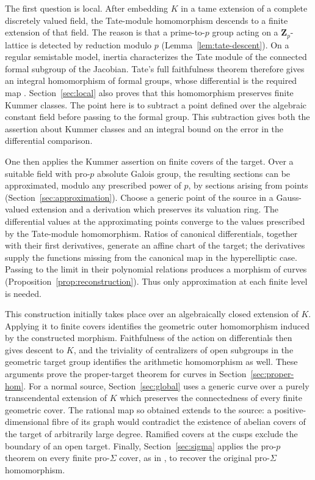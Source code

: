 \documentclass[11pt,a4paper]{article}
\numberwithin{equation}{section}
\theoremstyle{plain}
\theoremstyle{definition}
\theoremstyle{remark}
\newcommand{\Zp}{\mathbf Z_p}
\renewcommand{\S}{\ensuremath{\mathsection}}
\begin{document}
The first question is local. After embedding $K$ in a tame extension of a
complete discretely valued field, the Tate-module homomorphism descends to
a finite extension of that field. The reason is that a prime-to-$p$ group
acting on a $\Zp$-lattice is detected by reduction modulo $p$
(Lemma~\ref{lem:tate-descent}). On a regular semistable model, inertia
characterizes the Tate module of the connected formal subgroup of the
Jacobian. Tate's full faithfulness theorem therefore gives an integral
homomorphism of formal groups, whose differential is the required map
\cite[\S4.2, Theorem~4 and Corollary~1]{Tate1967}.
Section~\ref{sec:local} also proves that this homomorphism preserves finite
Kummer classes. The point here is to subtract a point defined over the
algebraic constant field before passing to the formal group. This
subtraction gives both the assertion about Kummer classes and an integral
bound on the error in the differential comparison.

One then applies the Kummer assertion on finite covers of the target.
Over a suitable field with pro-$p$ absolute Galois group, the resulting
sections can be approximated, modulo any prescribed power of $p$, by
sections arising from points (Section~\ref{sec:approximation}). Choose a
generic point of the source in a Gauss-valued extension and a derivation
which preserves its valuation ring. The differential values at the
approximating points converge to the values prescribed by the
Tate-module homomorphism. Ratios of canonical differentials, together
with their first derivatives, generate an affine chart of the target;
the derivatives supply the functions missing from the canonical map
in the hyperelliptic case. Passing to the limit in their polynomial
relations produces a morphism of curves
(Proposition~\ref{prop:reconstruction}). Thus only approximation at each
finite level is needed.

This construction initially takes place over an algebraically closed
extension of $K$. Applying it to finite covers identifies the geometric
outer homomorphism induced by the constructed morphism. Faithfulness of the
action on differentials then gives descent to $K$, and the triviality of
centralizers of open subgroups in the geometric target group identifies the arithmetic
homomorphism as well. These arguments prove the proper-target theorem
for curves in Section~\ref{sec:proper-hom}. For a normal source,
Section~\ref{sec:global} uses a generic curve over a purely transcendental
extension of $K$ which preserves the connectedness of every finite
geometric cover. The rational map so
obtained extends to the source: a positive-dimensional fibre of its
graph would contradict the existence of abelian covers of the target
of arbitrarily large degree. Ramified covers at the cusps exclude the
boundary of an open target. Finally, Section~\ref{sec:sigma} applies the
pro-$p$ theorem on every finite pro-$\Sigma$ cover, as in
\cite[Remark after Theorem~16.5]{Mochizuki1999}, to recover the original
pro-$\Sigma$ homomorphism.
\end{document}

